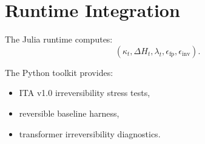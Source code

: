 \section*{Runtime Integration}

The Julia runtime computes:
\[
(\kappa_t, \Delta H_t, \lambda_t, \epsilon_{\text{fp}}, \epsilon_{\text{inv}}).
\]

The Python toolkit provides:
\begin{itemize}
    \item ITA v1.0 irreversibility stress tests,
    \item reversible baseline harness,
    \item transformer irreversibility diagnostics.
\end{itemize}
